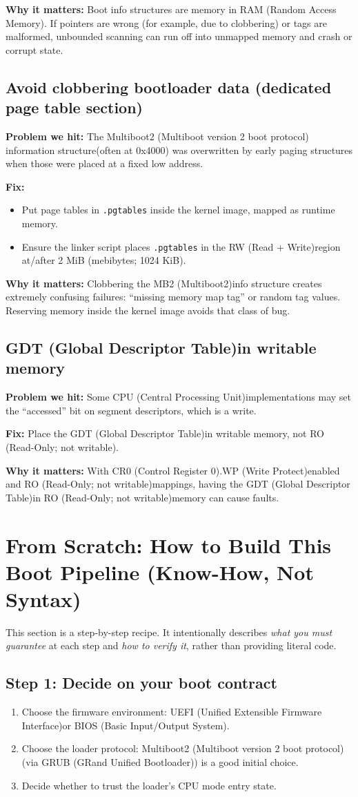 \documentclass[11pt]{article}
\newcommand{\BIOS}{BIOS (Basic Input/Output System)}
\newcommand{\CPU}{CPU (Central Processing Unit)}
\newcommand{\CRzero}{CR0 (Control Register 0)}
\newcommand{\GDT}{GDT (Global Descriptor Table)}
\newcommand{\GRUB}{GRUB (GRand Unified Bootloader)}
\newcommand{\MBtwo}{Multiboot2 (Multiboot version 2 boot protocol)}
\newcommand{\MBtwoInfo}{Multiboot2 (Multiboot version 2 boot protocol) information structure}
\newcommand{\MBtwoShort}{MB2 (Multiboot2)}
\newcommand{\MiB}{MiB (mebibytes; 1024 KiB)}
\newcommand{\RAM}{RAM (Random Access Memory)}
\newcommand{\RO}{RO (Read-Only; not writable)}
\newcommand{\RW}{RW (Read + Write)}
\newcommand{\UEFI}{UEFI (Unified Extensible Firmware Interface)}
\newcommand{\WP}{WP (Write Protect)}
\begin{document}
\textbf{Why it matters:}
Boot info structures are memory in \RAM. If pointers are wrong (for example, due to clobbering) or tags are malformed, unbounded scanning can run off into unmapped memory and crash or corrupt state.

\subsection{Avoid clobbering bootloader data (dedicated page table section)}
\textbf{Problem we hit:} The \MBtwoInfo (often at 0x4000) was overwritten by early paging structures when those were placed at a fixed low address.

\textbf{Fix:}
\begin{itemize}
  \item Put page tables in \texttt{.pgtables} inside the kernel image, mapped as runtime memory.
  \item Ensure the linker script places \texttt{.pgtables} in the \RW region at/after 2 \MiB.
\end{itemize}

\textbf{Why it matters:}
Clobbering the \MBtwoShort info structure creates extremely confusing failures: ``missing memory map tag'' or random tag values. Reserving memory inside the kernel image avoids that class of bug.

\subsection{\GDT in writable memory}
\textbf{Problem we hit:} Some \CPU implementations may set the ``accessed'' bit on segment descriptors, which is a write.

\textbf{Fix:} Place the \GDT in writable memory, not \RO.

\textbf{Why it matters:} With \CRzero.\WP enabled and \RO mappings, having the \GDT in \RO memory can cause faults.

\newpage
\section{From Scratch: How to Build This Boot Pipeline (Know-How, Not Syntax)}

This section is a step-by-step recipe. It intentionally describes \emph{what you must guarantee} at each step and \emph{how to verify it}, rather than providing literal code.

\subsection{Step 1: Decide on your boot contract}
\begin{enumerate}
  \item Choose the firmware environment: \UEFI or \BIOS.
  \item Choose the loader protocol: \MBtwo (via \GRUB) is a good initial choice.
  \item Decide whether to trust the loader’s CPU mode entry state.
\end{enumerate}
\end{document}
